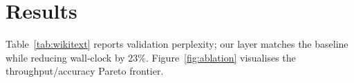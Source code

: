 \section{Results}
Table~\ref{tab:wikitext} reports validation perplexity; our layer matches the baseline while reducing wall‐clock by 23\%.  Figure~\ref{fig:ablation} visualises the throughput/accuracy Pareto frontier.